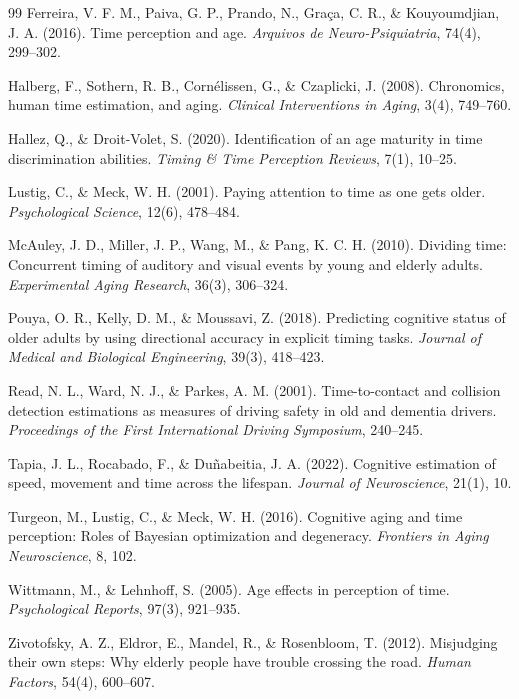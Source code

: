 \documentclass{custom_report}
\begin{document}
\begin{thebibliography}{99}
Ferreira, V. F. M., Paiva, G. P., Prando, N., Graça, C. R., \& Kouyoumdjian, J. A. (2016). Time perception and age. \textit{Arquivos de Neuro-Psiquiatria}, 74(4), 299–302.

Halberg, F., Sothern, R. B., Cornélissen, G., \& Czaplicki, J. (2008). Chronomics, human time estimation, and aging. \textit{Clinical Interventions in Aging}, 3(4), 749–760.

Hallez, Q., \& Droit-Volet, S. (2020). Identification of an age maturity in time discrimination abilities. \textit{Timing \& Time Perception Reviews}, 7(1), 10–25.

Lustig, C., \& Meck, W. H. (2001). Paying attention to time as one gets older. \textit{Psychological Science}, 12(6), 478–484.

McAuley, J. D., Miller, J. P., Wang, M., \& Pang, K. C. H. (2010). Dividing time: Concurrent timing of auditory and visual events by young and elderly adults. \textit{Experimental Aging Research}, 36(3), 306–324.

Pouya, O. R., Kelly, D. M., \& Moussavi, Z. (2018). Predicting cognitive status of older adults by using directional accuracy in explicit timing tasks. \textit{Journal of Medical and Biological Engineering}, 39(3), 418–423.

Read, N. L., Ward, N. J., \& Parkes, A. M. (2001). Time-to-contact and collision detection estimations as measures of driving safety in old and dementia drivers. \textit{Proceedings of the First International Driving Symposium}, 240–245.

Tapia, J. L., Rocabado, F., \& Duñabeitia, J. A. (2022). Cognitive estimation of speed, movement and time across the lifespan. \textit{Journal of Neuroscience}, 21(1), 10.

Turgeon, M., Lustig, C., \& Meck, W. H. (2016). Cognitive aging and time perception: Roles of Bayesian optimization and degeneracy. \textit{Frontiers in Aging Neuroscience}, 8, 102.

Wittmann, M., \& Lehnhoff, S. (2005). Age effects in perception of time. \textit{Psychological Reports}, 97(3), 921–935.

Zivotofsky, A. Z., Eldror, E., Mandel, R., \& Rosenbloom, T. (2012). Misjudging their own steps: Why elderly people have trouble crossing the road. \textit{Human Factors}, 54(4), 600–607.

\end{thebibliography}
\end{document}
